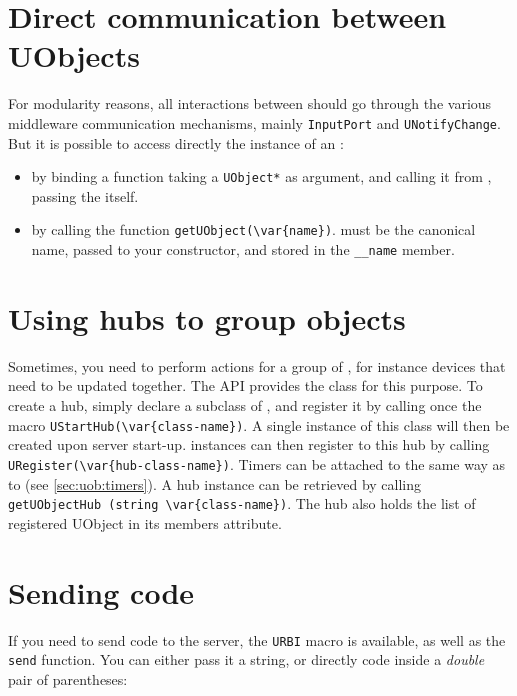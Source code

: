 \section{Direct communication between UObjects}
\label{sec:uob:api:direct}

For modularity reasons, all interactions between \UObjects should go through
the various middleware communication mechanisms, mainly
\lstinline{InputPort} and \lstinline{UNotifyChange}. But it is possible to
access directly the \Cxx instance of an \UObject:

\begin{itemize}
\item by binding a function taking a \lstinline{UObject*} as argument, and
  calling it from \us, passing the \UObject itself.
\item by calling the \Cxx function \lstinline|getUObject(\var{name})|.
   must be the canonical \UObject name, passed to your
  constructor, and stored in the \lstinline{__name} member.
\end{itemize}


\section{Using hubs to group objects}

Sometimes, you need to perform actions for a group of \UObjects, for
instance devices that need to be updated together. The API provides the
\UObjectHub class for this purpose. To create a hub, simply declare a
subclass of \UObjectHub, and register it by calling once the macro
\lstinline|UStartHub(\var{class-name})|. A single instance of this class
will then be created upon server start-up. \UObject instances can then
register to this hub by calling %
\lstinline|URegister(\var{hub-class-name})|. %
Timers can be attached to \UObjectHub the same way as to \UObject (see
\autoref{sec:uob:timers}). A hub instance can be retrieved by calling
\lstinline|getUObjectHub (string \var{class-name})|. The hub also holds the
list of registered UObject in its members attribute.

\section{Sending \us code}

If you need to send \us code to the server, the \lstinline{URBI} macro is
available, as well as the \lstinline{send} function. You can either pass it
a string, or directly \us code inside a \emph{double} pair of parentheses:

